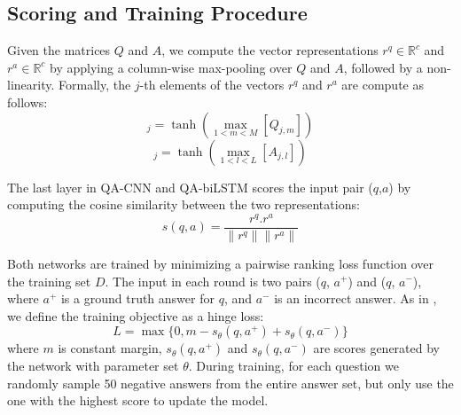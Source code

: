 \documentclass{article}
\begin{document}
\subsection{Scoring and Training Procedure}
Given the matrices $Q$ and $A$, 
we compute the vector representations $r^{q} \in \mathbb{R}^{c}$ and $r^{a} \in \mathbb{R}^{c}$ by applying a column-wise max-pooling over $Q$ and $A$, 
followed by a non-linearity.
Formally, 
the $j$-th elements of the vectors $r^q$ and $r^a$ are compute as follows:
\begin{equation}
[r^{q}]_j =\tanh\left(\max_{1 < m < M}\left[Q_{j,m}\right]\right)
\end{equation}
\begin{equation}
[r^{a}]_j =\tanh\left(\max_{1 < l < L}\left[A_{j,l}\right]\right)
\end{equation}

The last layer in QA-CNN and QA-biLSTM scores the input pair ($q$,$a$) by  computing the cosine similarity between the two representations:
\begin{equation} \label{cosine_sim}
s(q,a)=\frac{r^q.r^a}{\|r^q\| \|r^a\|}
\end{equation}

Both networks are trained by minimizing a pairwise ranking loss function over the training set $D$.
The input in each round is two pairs ($q$, $a^{+}$) and ($q$, $a^{-}$),
where $a^{+}$ is a ground truth answer for $q$,
and $a^{-}$ is an incorrect answer.
As in \cite{weston2014,hu2014}, 
we define the training objective as a hinge loss:
\begin{equation}
L = \max \{ 0, m - s_{\theta}(q, a^+) + s_{\theta}(q, a^-) \}
\end{equation}
where $m$ is constant margin,
$s_{\theta}(q, a^+)$ and $ s_{\theta}(q, a^-)$
are scores generated by the network with parameter set $\theta$.
During training,
for each question we randomly sample 50 negative answers from the entire answer set,
but only use the one with the highest score to update the model.
\end{document}
